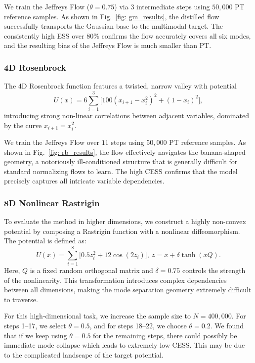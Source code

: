 \documentclass[%
 reprint,
 amsmath,amssymb,
 aps,
 pre,
]{revtex4-2}
\begin{document}
We train the Jeffreys Flow ($\theta = 0.75$) via 3 intermediate steps using $50,000$ PT reference samples. As shown in Fig.~\ref{fig: gm_results}, the distilled flow successfully transports the Gaussian base to the multimodal target. The consistently high ESS over $80\%$ confirms the flow accurately covers all six modes, and the resulting bias of the Jeffreys Flow is much smaller than PT.

\subsubsection*{4D Rosenbrock}

The 4D Rosenbrock function features a twisted, narrow valley with potential
\begin{equation*}
	U(x)=6\sum_{i=1}^3 \Big[ 100(x_{i+1} - x_i^2)^2 + (1 - x_i)^2 \Big],
\end{equation*}
introducing strong non-linear correlations between adjacent variables, dominated by the curve $x_{i+1} = x_i^2$.

We train the Jeffreys Flow over $11$ steps using $50,000$ PT reference samples. As shown in Fig.~\ref{fig: rb_results}, the flow effectively navigates the banana-shaped geometry, a notoriously ill-conditioned structure that is generally difficult for standard normalizing flows to learn. The high CESS confirms that the model precisely captures all intricate variable dependencies.

\subsubsection*{8D Nonlinear Rastrigin}

To evaluate the method in higher dimensions, we construct a highly non-convex potential by composing a Rastrigin function with a nonlinear diffeomorphism. The potential is defined as:
\begin{equation*}
	U(x) = \sum_{i=1}^8 \Big[ 0.5z_i^2 + 12 \cos(2z_i) \Big], ~ z = x + \delta \tanh(xQ).
\end{equation*}
Here, $Q$ is a fixed random orthogonal matrix and $\delta = 0.75$ controls the strength of the nonlinearity. This transformation introduces complex dependencies between all dimensions, making the mode separation geometry extremely difficult to traverse.

For this high-dimensional task, we increase the sample size to $N = 400,000$. For steps 1--17, we select $\theta = 0.5$, and for steps 18--22, we choose $\theta = 0.2$. We found that if we keep using $\theta = 0.5$ for the remaining steps, there could possibly be immediate mode collapse which leads to extremely low CESS. This may be due to the complicated landscape of the target potential.
\end{document}

